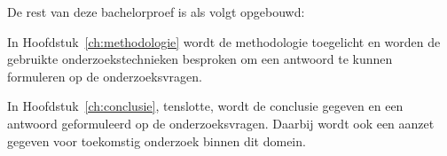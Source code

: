 De rest van deze bachelorproef is als volgt opgebouwd:

In Hoofdstuk~\ref{ch:methodologie} wordt de methodologie toegelicht en worden de gebruikte onderzoekstechnieken besproken om een antwoord te kunnen formuleren op de onderzoeksvragen.


In Hoofdstuk~\ref{ch:conclusie}, tenslotte, wordt de conclusie gegeven en een antwoord geformuleerd op de onderzoeksvragen. Daarbij wordt ook een aanzet gegeven voor toekomstig onderzoek binnen dit domein.

